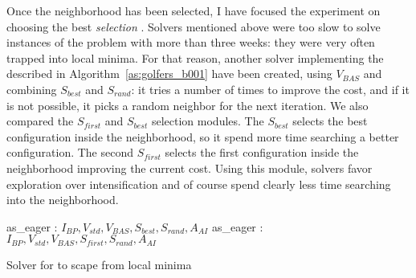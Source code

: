 \separation

Once the neighborhood \om{} has been selected, I have focused the experiment on choosing the best {\it selection} \om. Solvers mentioned above were too slow to solve instances of the problem with more than three weeks: they were very often trapped into local minima. For that reason, another solver implementing the \as{} described in Algorithm~\ref{as:golfers_b001} have been created, using $V_{BAS}$ and combining $S_{best}$ and $S_{rand}$: it tries a number of times to improve the cost, and if it is not possible, it picks a random neighbor for the next iteration. We also compared the $S_{first}$ and $S_{best}$ selection modules. The \om{} $S_{best}$ selects the best configuration inside the neighborhood, so it spend more time searching a better configuration. %
The second \om{} $S_{first}$ selects the first configuration inside the neighborhood improving the current cost. Using this module, solvers favor exploration over intensification and of course spend clearly less time searching into the neighborhood. 

\begin{algorithm}[H]
\dontprintsemicolon
\SetNoline
{}
   as\_eager\;
\algoindent {} : $I_{BP}, V_{std}, V_{BAS}, S_{best}, S_{rand}, A_{AI}$ \;
   as\_eager\;
\algoindent {} : $I_{BP}, V_{std}, V_{BAS}, S_{first}, S_{rand}, A_{AI}$ \;
\caption{Solver for \SGP{} to scape from local minima}\label{as:golfers_b001}
\end{algorithm}

